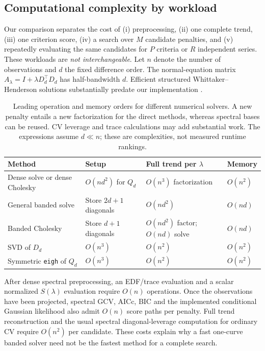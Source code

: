 \subsection{Computational complexity by workload}
\label{sec:sncs-complexity}
Our comparison separates the cost of (i) preprocessing,
(ii) one complete trend, (iii) one criterion score,
(iv) a search over $M$ candidate penalties, and
(v) repeatedly evaluating the same candidates for $P$
criteria or $R$ independent series. These workloads
are \emph{not interchangeable}. Let $n$ denote the
number of observations and $d$ the fixed difference
order. The normal-equation matrix
$A_\lambda=I+\lambda D_d^\top D_d$
has half-bandwidth $d$. Efficient structured
Whittaker--Henderson solutions substantially predate
our implementation \cite{weinert2007wh}.

\begin{table}[tbp]
\centering\scriptsize\setlength{\tabcolsep}{3pt}
\caption{Leading operation and memory orders for
different numerical solvers. A new penalty entails
a new factorization for the direct methods, whereas
spectral bases can be reused. CV leverage and
trace calculations may add substantial work.
The expressions assume $d\ll n$; these are
complexities, not measured runtime rankings.}
\label{tab:sncs-solver-complexity}
\begin{tabular}{p{.29\linewidth}p{.23\linewidth}p{.24\linewidth}p{.12\linewidth}}
\toprule
Method & Setup & Full trend per $\lambda$ & Memory\\
\midrule
Dense solve or dense Cholesky
& $O(nd^2)$ for $Q_d$
& $O(n^3)$ factorization
& $O(n^2)$\\
General banded solve
& Store $2d+1$ diagonals
& $O(nd^2)$
& $O(nd)$\\
Banded Cholesky
& Store $d+1$ diagonals
& $O(nd^2)$ factor; $O(nd)$ solve
& $O(nd)$\\
SVD of $D_d$
& $O(n^3)$
& $O(n^2)$
& $O(n^2)$\\
Symmetric \texttt{eigh} of $Q_d$
& $O(n^3)$
& $O(n^2)$
& $O(n^2)$\\
\bottomrule
\end{tabular}
\end{table}

After dense spectral preprocessing, an EDF/trace
evaluation and a scalar normalized $S(\lambda)$
evaluation require $O(n)$ operations. Once the
observations have been projected, spectral
GCV, AICc, BIC and the implemented conditional
Gaussian likelihood also admit $O(n)$ score
paths per penalty. Full trend reconstruction
and the usual spectral diagonal-leverage
computation for ordinary CV require
$O(n^2)$ per candidate. These costs explain
why a fast one-curve banded solver need not
be the fastest method for a complete search.

